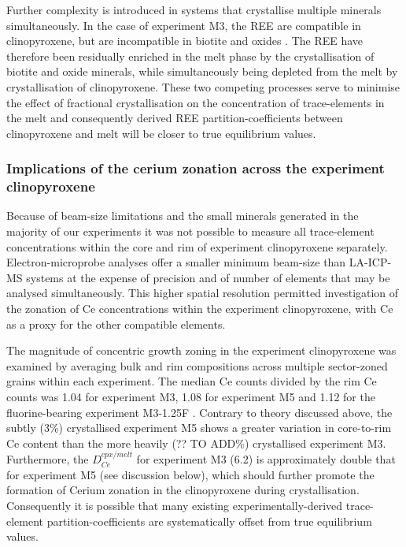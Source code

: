 \documentclass[review,authoryear,12pt]{elsarticle}
\begin{document}
    Further complexity is introduced in systems that crystallise multiple minerals simultaneously. In the case of experiment M3, the REE are compatible in clinopyroxene, but are incompatible in biotite and oxides \citep[e.g.][]{Mahood1990,Schmidt1999}. The REE have therefore been residually enriched in the melt phase by the crystallisation of biotite and oxide minerals, while simultaneously being depleted from the melt by crystallisation of clinopyroxene. These two competing processes serve to minimise the effect of fractional crystallisation on the concentration of trace-elements in the melt and consequently derived REE partition-coefficients between clinopyroxene and melt will be closer to true equilibrium values.

\subsubsection{Implications of the cerium zonation across the experiment clinopyroxene}
Because of beam-size limitations and the small minerals generated in the majority of our experiments it was not possible to measure all trace-element concentrations within the core and rim of experiment clinopyroxene separately.
    Electron-microprobe analyses offer a smaller minimum beam-size than LA-ICP-MS systems at the expense of precision and of number of elements that may be analysed simultaneously. This higher spatial resolution permitted investigation of the zonation of Ce concentrations within the experiment clinopyroxene, with Ce as a proxy for the other compatible elements.


The magnitude of concentric growth zoning in the experiment clinopyroxene was examined by averaging bulk and rim compositions across multiple sector-zoned grains within each experiment. The median Ce counts divided by the rim Ce counts was 1.04 for experiment M3, 1.08 for experiment M5 and 1.12 for the fluorine-bearing experiment M3-1.25F \citep[see][]{Beard_PhD_Thesis}. Contrary to theory discussed above, the subtly (3\%) crystallised experiment M5 shows a greater variation in core-to-rim Ce content than the more heavily (?? TO ADD\%) crystallised experiment M3. Furthermore, the $D_{Ce}^{cpx/melt}$ for experiment M3 (6.2) is approximately double that for experiment M5 (see discussion below), which should further promote the formation of Cerium zonation in the clinopyroxene during crystallisation. Consequently it is possible that many existing experimentally-derived trace-element partition-coefficients are systematically offset from true equilibrium values.
\end{document}
